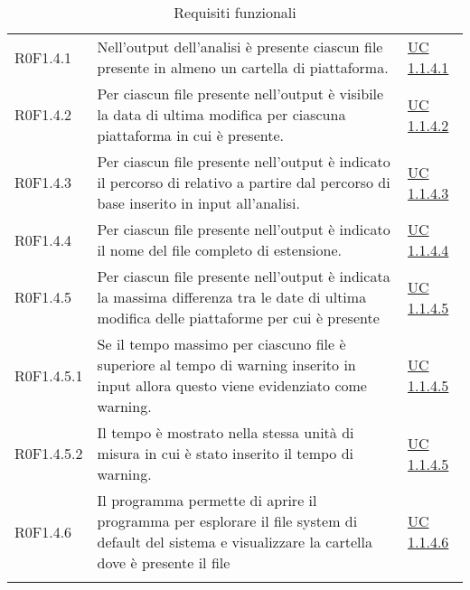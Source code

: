 \begin{center}
\begin{longtable}{p{4.2cm}!{\color{white}\vrule width 0.5mm}p{6cm}!{\color{white}\vrule width 0.5mm}p{2.5cm}!{\color{white}\vrule width 0.5mm}}
				\hspace{4mm}\hypertarget{R0F1.4.1}{R0F1.4.1} & Nell'output dell'analisi è presente ciascun file presente in almeno un cartella di piattaforma. & \hyperref[subsec:UC1.1.4.1]{UC 1.1.4.1}\\
				
				\hspace{4mm}\hypertarget{R0F1.4.2}{R0F1.4.2} & Per ciascun file presente nell'output è visibile la data di ultima modifica per ciascuna piattaforma in cui è presente. & \hyperref[subsec:UC1.1.4.2]{UC 1.1.4.2}\\
				
				\hspace{4mm}\hypertarget{R0F1.4.3}{R0F1.4.3} & Per ciascun file presente nell'output è indicato il percorso di relativo a partire dal percorso di base inserito in input all'analisi. & \hyperref[subsec:UC1.1.4.3]{UC 1.1.4.3}\\
				
				\hspace{4mm}\hypertarget{R0F1.4.4}{R0F1.4.4} & Per ciascun file presente nell'output è indicato il nome del file completo di estensione. & \hyperref[subsec:UC1.1.4.4]{UC 1.1.4.4}\\
				
				\hspace{4mm}\hypertarget{R0F1.4.5}{R0F1.4.5} & Per ciascun file presente nell'output è indicata la massima differenza tra le date di ultima modifica delle piattaforme per cui è presente & \hyperref[subsec:UC1.1.4.5]{UC 1.1.4.5}\\
				
				\hspace{6mm}\hypertarget{R0F1.4.5.1}{R0F1.4.5.1} & Se il tempo massimo per ciascuno file è superiore al tempo di warning inserito in input allora questo viene evidenziato come warning. & \hyperref[subsec:UC1.1.4.5]{UC 1.1.4.5}\\
				
				\hspace{6mm}\hypertarget{R0F1.4.5.2}{R0F1.4.5.2} & Il tempo è mostrato nella stessa unità di misura in cui è stato inserito il tempo di warning. & \hyperref[subsec:UC1.1.4.5]{UC 1.1.4.5}\\
				
				\hspace{4mm}\hypertarget{R0F1.4.6}{R0F1.4.6} & Il programma permette di aprire il programma per esplorare il file system di default del sistema e visualizzare la cartella dove è presente il file & \hyperref[subsec:UC1.1.4.6]{UC 1.1.4.6}\\
				
				\hline
				\caption{Requisiti funzionali}
			\end{longtable}
		\end{center}

